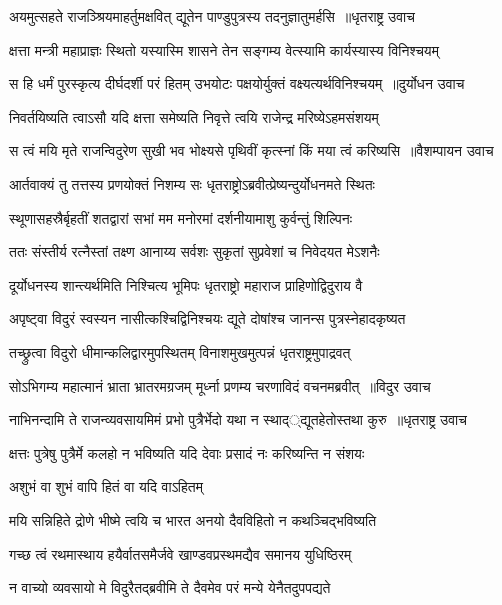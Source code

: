 \twolineshloka
{अयमुत्सहते राजञ्श्रियमाहर्तुमक्षवित्}
{द्यूतेन पाण्डुपुत्रस्य तदनुज्ञातुमर्हसि ॥धृतराष्ट्र उवाच}


\twolineshloka
{क्षत्ता मन्त्री महाप्राज्ञः स्थितो यस्यास्मि शासने}
{तेन सङ्गम्य वेत्स्यामि कार्यस्यास्य विनिश्चयम्}


\threelineshloka
{स हि धर्मं पुरस्कृत्य दीर्घदर्शी परं हितम्}
{उभयोटः पक्षयोर्युक्तं वक्ष्यत्यर्थविनिश्चयम् ॥दुर्योधन उवाच}
{}


\twolineshloka
{निवर्तयिष्यति त्वाऽसौ यदि क्षत्ता समेष्यति}
{निवृत्ते त्वयि राजेन्द्र मरिष्येऽहमसंशयम्}


\twolineshloka
{स त्वं मयि मृते राजन्विदुरेण सुखी भव}
{भोक्ष्यसे पृथिवीं कृत्स्नां किं मया त्वं करिष्यसि ॥वैशम्पायन उवाच}


\twolineshloka
{आर्तवाक्यं तु तत्तस्य प्रणयोक्तं निशम्य सः}
{धृतराष्ट्रोऽब्रवीत्प्रेष्यन्दुर्योधनमते स्थितः}


\twolineshloka
{स्थूणासहस्रैर्बृहतीं शतद्वारां सभां मम}
{मनोरमां दर्शनीयामाशु कुर्वन्तुं शिल्पिनः}


\twolineshloka
{ततः संस्तीर्य रत्नैस्तां तक्ष्ण आनाय्य सर्वशः}
{सुकृतां सुप्रवेशां च निवेदयत मेऽशनैः}


\twolineshloka
{दूर्योधनस्य शान्त्यर्थमिति निश्चित्य भूमिपः}
{धृतराष्ट्रो महाराज प्राहिणोद्विदुराय वै}


\twolineshloka
{अपृष्ट्वा विदुरं स्वस्यन नासीत्कश्चिद्विनिश्चयः}
{द्यूते दोषांश्च जानन्स पुत्रस्नेहादकृष्यत}


\twolineshloka
{तच्छ्रुत्वा विदुरो धीमान्कलिद्वारमुपस्थितम्}
{विनाशमुखमुत्पन्नं धृतराष्ट्रमुपाद्रवत्}


\threelineshloka
{सोऽभिगम्य महात्मानं भ्राता भ्रातरमग्रजम्}
{मूर्ध्ना प्रणम्य चरणाविदं वचनमब्रवीत् ॥विदुर उवाच}
{}


\threelineshloka
{नाभिनन्दामि ते राजन्व्यवसायमिमं प्रभो}
{पुत्रैर्भेदो यथा न स्थाद््द्यूतहेतोस्तथा कुरु ॥धृतराष्ट्र उवाच}
{}


\twolineshloka
{क्षत्तः पुत्रेषु पुत्रैर्मे कलहो न भविष्यति}
{यदि देवाः प्रसादं नः करिष्यन्ति न संशयः}


\twolineshloka
{अशुभं वा शुभं वापि हितं वा यदि वाऽहितम्}
{}


\twolineshloka
{मयि सन्निहिते द्रोणे भीष्मे त्वयि च भारत}
{अनयो दैवविहितो न कथञ्चिद्भविष्यति}


\twolineshloka
{गच्छ त्वं रथमास्थाय हयैर्वातसमैर्जवे}
{खाण्डवप्रस्थमद्यैव समानय युधिष्ठिरम्}


\twolineshloka
{न वाच्यो व्यवसायो मे विदुरैतद्ब्रवीमि ते}
{दैवमेव परं मन्ये येनैतदुपपद्यते}


